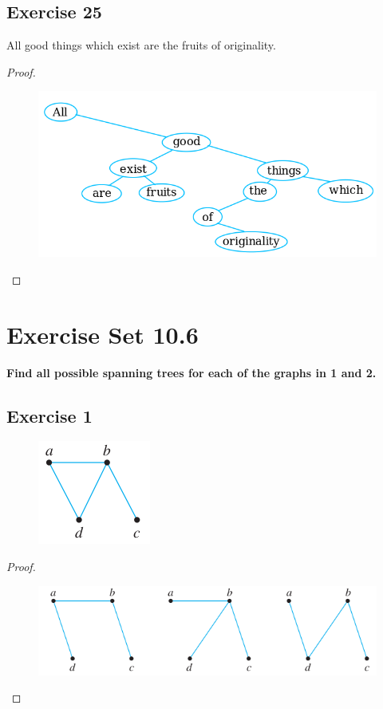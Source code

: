 \documentclass[14pt]{extarticle}
\newcommand{\cy}{\color{cyan}}
\begin{document}
\subsection{Exercise 25}
All good things which exist are the fruits of originality.
\begin{proof}
    \begin{figure}[ht!]
        \centering
        \includegraphics[scale=0.5]{../images/10.5.25.png}
    \end{figure}
\end{proof}

\section{Exercise Set 10.6}
 {\bf \cy Find all possible spanning trees for each of the graphs in 1 and 2.}

\subsection{Exercise 1}
\begin{figure}[ht!]
    \centering
    \includegraphics[scale=0.5]{../images/10.6.1.png}
\end{figure}

\begin{proof}
    \begin{figure}[ht!]
        \centering
        \includegraphics[scale=0.4]{../images/10.6.1.2.png}
    \end{figure}
\end{proof}
\end{document}

